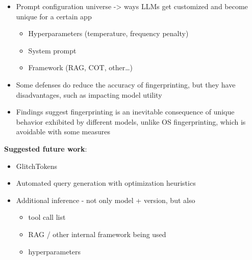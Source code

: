 \documentclass[
  letterpaper,
  DIV=11,
  numbers=noendperiod]{scrartcl}
\providecommand{\tightlist}{%
  \setlength{\itemsep}{0pt}\setlength{\parskip}{0pt}}
\begin{document}
\begin{itemize}
  \begin{itemize}
  \tightlist
  \item
    Closed-set: classifier
  \item
    Open-set: siamese-like, contrastive learning (``is this LLM the same
    as this other LLM?'')
  \end{itemize}
\item
  Prompt configuration universe -\textgreater{} ways LLMs get customized
  and become unique for a certain app

  \begin{itemize}
  \tightlist
  \item
    Hyperparameters (temperature, frequency penalty)
  \item
    System prompt
  \item
    Framework (RAG, COT, other\ldots)
  \end{itemize}
\item
  Some defenses do reduce the accuracy of fingerprinting, but they have
  disadvantages, such as impacting model utility
\item
  Findings suggest fingerprinting is an inevitable consequence of unique
  behavior exhibited by different models, unlike OS fingerprinting,
  which is avoidable with some measures
\end{itemize}

\textbf{Suggested future work}:

\begin{itemize}
\tightlist
\item
  GlitchTokens
\item
  Automated query generation with optimization heuristics
\item
  Additional inference - not only model + version, but also

  \begin{itemize}
  \tightlist
  \item
    tool call list
  \item
    RAG / other internal framework being used
  \item
    hyperparameters
  \end{itemize}
\end{itemize}

\subsubsection{\texorpdfstring{\autocite{BiscontiPRGS26_AdversarialPoetry}}{{[}@BiscontiPRGS26\_AdversarialPoetry{]}}}\label{biscontiprgs26_adversarialpoetry}
\end{document}
